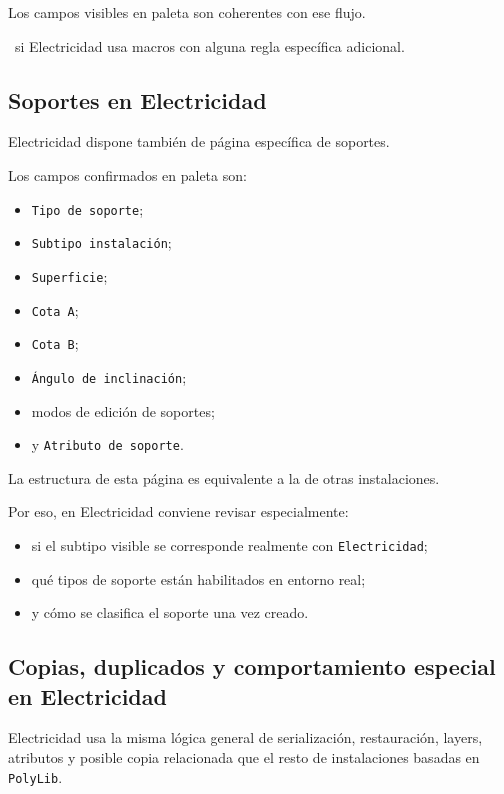 Los campos visibles en paleta son coherentes con ese flujo.

\pendingtag\ si Electricidad usa macros con alguna regla específica adicional.


\subsection{Soportes en Electricidad}

Electricidad dispone también de página específica de soportes.

Los campos confirmados en paleta son:

\begin{itemize}
\item \texttt{Tipo de soporte};
\item \texttt{Subtipo instalación};
\item \texttt{Superficie};
\item \texttt{Cota A};
\item \texttt{Cota B};
\item \texttt{Ángulo de inclinación};
\item modos de edición de soportes;
\item y \texttt{Atributo de soporte}.
\end{itemize}

La estructura de esta página es equivalente a la de otras instalaciones.

Por eso, en Electricidad conviene revisar especialmente:

\begin{itemize}
\item si el subtipo visible se corresponde realmente con \texttt{Electricidad};
\item qué tipos de soporte están habilitados en entorno real;
\item y cómo se clasifica el soporte una vez creado.
\end{itemize}


\subsection{Copias, duplicados y comportamiento especial en Electricidad}

Electricidad usa la misma lógica general de serialización, restauración, layers, atributos y posible copia relacionada que el resto de instalaciones basadas en \texttt{PolyLib}.

